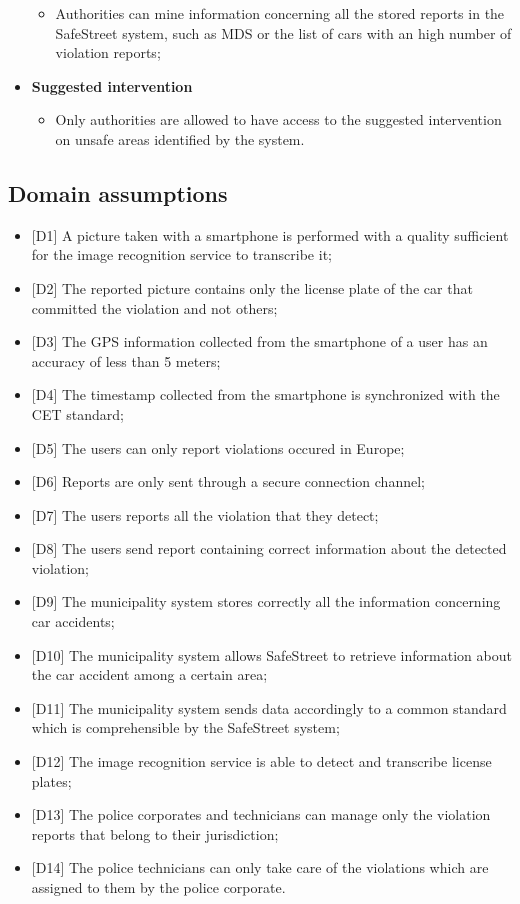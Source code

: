 \begin{itemize}
\begin{itemize}
            \item Authorities can mine information concerning all the stored reports in the SafeStreet system, such as MDS or the list of cars with an high number of violation reports;
        \end{itemize}
    \item \textbf{Suggested intervention}
        \begin{itemize}
            \item Only authorities are allowed to have access to the suggested intervention on unsafe areas identified by the system.
        \end{itemize}
    \end{itemize}
\subsection{Domain assumptions}
\begin{itemize}
    \item {[D1]}  A picture taken with a smartphone is performed with a quality sufficient for the image recognition service to transcribe it;
    \item {[D2]}  The reported picture contains only the license plate of the car that committed the violation and not others;
    \item {[D3]}  The GPS information collected from the smartphone of a user has an accuracy of less than 5 meters;
    \item {[D4]}  The timestamp collected from the smartphone is synchronized with the CET standard;
    \item {[D5]}  The users can only report violations occured in Europe;
    \item {[D6]}  Reports are only sent through a secure connection channel;
    \item {[D7]}  The users reports all the violation that they detect;
    \item {[D8]}  The users send report containing correct information about the detected violation;
    \item {[D9]}  The municipality system stores correctly all the information concerning car accidents;
    \item {[D10]} The municipality system allows SafeStreet to retrieve information about the car accident among a certain area;
    \item {[D11]} The municipality system sends data accordingly to a common standard which is comprehensible by the SafeStreet system;
    \item {[D12]} The image recognition service is able to detect and transcribe license plates;
    \item {[D13]} The police corporates and technicians can manage only the violation reports that belong to their jurisdiction;
    \item {[D14]} The police technicians can only take care of the violations which are assigned to them by the police corporate.
\end{itemize}